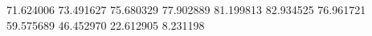 71.624006
73.491627
75.680329
77.902889
81.199813
82.934525
76.961721
59.575689
46.452970
22.612905
8.231198
